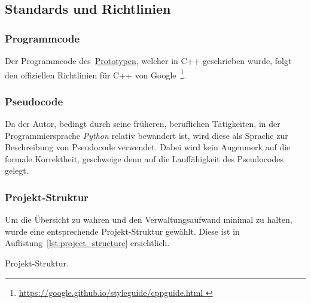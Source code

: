 \subsection{Standards und Richtlinien}
\label{subsec:standards_guidelines}

\subsubsection{Programmcode}
\label{ssubsec:standards_guidelines:code}

Der Programmcode des~\hyperref[chap:prototype]{Prototypen}, welcher in C++ geschrieben wurde, folgt
den offiziellen Richtlinien für C++ von Google~\footnote{
    \href{https://google.github.io/styleguide/cppguide.html}{
        https://google.github.io/styleguide/cppguide.html
    }
}.

\subsubsection{Pseudocode}
\label{ssubsec:standards_guidelines:psuedocode}

Da der Autor, bedingt durch seine früheren, beruflichen Tätigkeiten, in der
Programmiersprache \textit{Python} relativ bewandert ist, wird diese als
Sprache zur Beschreibung von Pseudocode verwendet.  Dabei wird kein
Augenmerk auf die formale Korrektheit, geschweige denn auf die
Lauffähigkeit des Pseudocodes gelegt.

\subsubsection{Projekt-Struktur}
\label{ssubsec:standards_guidelines:project_structure}

Um die Übersicht zu wahren und den Verwaltungsaufwand minimal zu halten,
wurde eine entsprechende Projekt-Struktur gewählt. Diese ist in
Auflistung~\ref{lst:project_structure} ersichtlich.

\begin{listing}
	\caption{Projekt-Struktur.}\label{lst:project_structure}
\end{listing}

